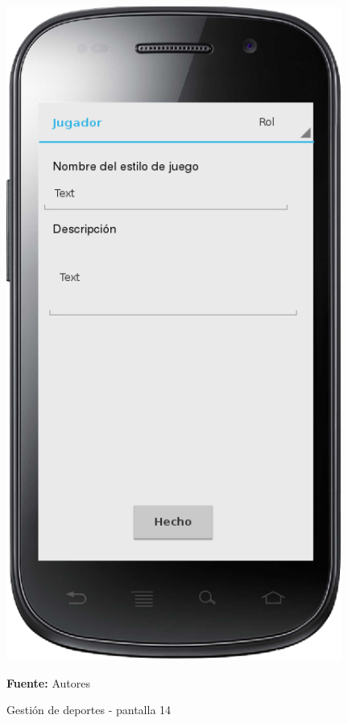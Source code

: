 \begin{figure}[!htb]
  \begin{center}
    \includegraphics[width=11cm]{./imagenes/UI/Deportes/gestion_deportes_14.png}
    \caption{Gestión de deportes - pantalla 14}
    \label{fig:gestion_deportes_14}
    \textbf{Fuente:}  Autores
  \end{center}
\end{figure}